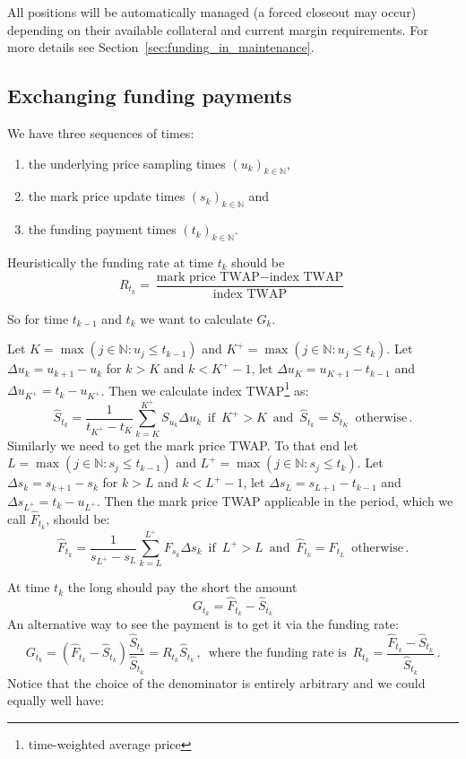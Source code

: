 \documentclass[10pt]{article}
\begin{document}
All positions will be automatically managed (a forced closeout may occur) depending on their available collateral and current margin requirements. 
For more details see Section~\ref{sec:funding_in_maintenance}.

\subsection{Exchanging funding payments}\label{sec:funding_payment}

We have three sequences of times: 
\begin{enumerate}
    \item the underlying price sampling times $(u_k)_{k \in \mathbb N}$,
    \item the mark price update times $(s_k)_{k\in \mathbb N}$ and
    \item the funding payment times $(t_k)_{k\in \mathbb N}$.
\end{enumerate}

Heuristically the funding rate at time $t_k$ should be
\[
R_{t_k} = \frac{\text{mark price TWAP} - \text{index TWAP}}{\text{index TWAP}}
\]

So for time $t_{k-1}$ and $t_k$ we want to calculate $G_k$. 

Let $K=\max(j\in \mathbb N : u_j \leq t_{k-1})$ and 
$K^+ = \max(j\in \mathbb N : u_j \leq t_k)$. Let $\Delta u_k = u_{k+1} - u_{k}$ for $k > K$ and $k < K^{+}-1$, let $\Delta u_{K} = u_{K+1} - t_{k-1}$ and $\Delta u_{K^+} = t_k - u_{K^+}$. Then we calculate index TWAP\footnote{time-weighted average price} as:
\[
\hat S_{t_k} = \frac1{t_{K^+} - t_{K}}\sum_{k=K}^{K^+} S_{u_k} \Delta u_k\,\,\,\text{if}\,\,\, K^+ > K\,\,\, \text{and} \,\,\, \hat S_{t_k} = S_{t_K}\,\,\, \text{otherwise}\,.    
\]
Similarly we need to get the mark price TWAP. 
To that end let $L = \max(j\in \mathbb N : s_j \leq t_{k-1})$ and $L^+ = \max(j\in \mathbb N : s_j \leq t_k)$. 
Let $\Delta s_k = s_{k+1} - s_{k}$ for $k > L$ and $k < L^{+}-1$, let $\Delta s_L=s_{L+1}-t_{k-1}$ and $\Delta s_{L^+}=t_k-u_{L^+}$. 
Then the mark price TWAP applicable in the period, which we call $\hat F_{t_k}$, should be:
\[
\hat F_{t_k} = \frac1{s_{L^+} - s_L}\sum_{k=L}^{L^+} F_{s_k} \Delta s_k\,\,\,\text{if}\,\,\, L^+ > L\,\,\, \text{and} \,\,\, \hat F_{t_k} = F_{t_L}\,\,\, \text{otherwise}\,.    
\]
 
At time $t_k$ the long should pay the short the amount
\[
G_{t_k} = \hat F_{t_k} - \hat S_{t_k}   
\]
An alternative way to see the payment is to get it via the funding rate:
\[
G_{t_k} = (\hat F_{t_k} - \hat S_{t_k})\frac{\hat S_{t_k}}{\hat S_{t_k}} = R_{t_k} \hat S_{t_k}\,,\,\,\,\text{where the funding rate is}\,\,\, R_{t_k} = \frac{\hat F_{t_k} - \hat S_{t_k}}{\hat S_{t_k}}\,.
\]
Notice that the choice of the denominator is entirely arbitrary and we could equally well have:
\end{document}
